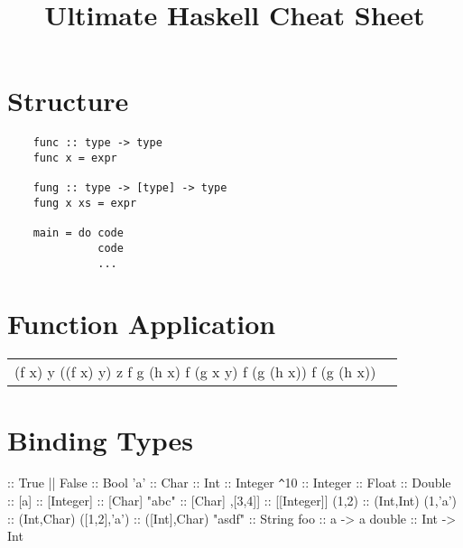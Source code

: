 \documentclass{refcard}
\title{Ultimate Haskell Cheat Sheet}
\begin{document}
\maketitle

\section{Structure}

\begin{verbatim}
	func :: type -> type
	func x = expr

	fung :: type -> [type] -> type
	fung x xs = expr

	main = do code
	          code
	          ...
\end{verbatim}


\section{Function Application}

\begin{tabular}{CC}
	\li[f x y] (f x) y
	\li[f x y z] ((f x) y) z
	\li[f g \$ h x] f g (h x)
	\li[f \$ g x y] f (g x y)
	\li[f \$ g \$ h x] f (g (h x))
	\li[(f .\s{}g .\s{}h) x] f (g (h x))
\end{tabular}


\section{Binding Types}

\begin{ldesc}
	               \s::\s{}
	\li[boolean]                True || False :: Bool
	\li[character]              'a' :: Char
	 :: Int
	 :: Integer
	\verb+^+10 :: Integer
	 :: Float 
	 :: Double
	\li[list]                   [] :: [a]
	\li[]                       [1,2,3] :: [Integer]
	\li[]                       ['a','b','c'] :: [Char]
	\li                         "abc" :: [Char]
	\li[]                       [[1,2],[3,4]] :: [[Integer]]
	\li[tuple]                  (1,2) :: (Int,Int)
	\li                         (1,'a') :: (Int,Char)
	\li                         ([1,2],'a') :: ([Int],Char)
	\li[string]                 "asdf" :: String
	\li[functions]              foo :: a -> a
	\li                         double :: Int -> Int
\end{ldesc}
\end{document}
